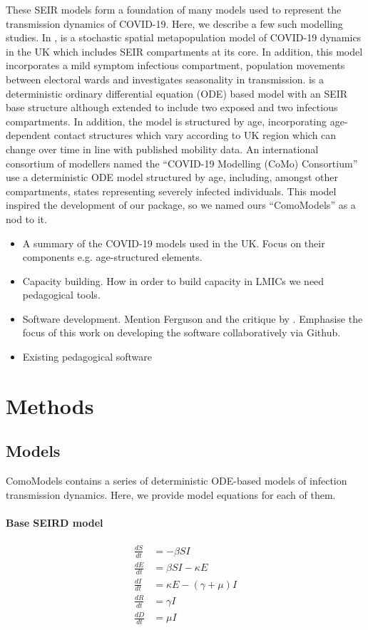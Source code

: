 \documentclass[]{article}
\begin{document}
These SEIR models form a foundation of many models used to represent the transmission dynamics of COVID-19. Here, we describe a few such modelling studies.  In \cite{danon2020spatial}, is a stochastic spatial metapopulation model of COVID-19 dynamics in the UK which includes SEIR compartments at its core. In addition, this model incorporates a mild symptom infectious compartment, population movements between electoral wards and investigates seasonality in transmission. \cite{birrell2021real} is a deterministic ordinary differential equation (ODE) based model with an SEIR base structure although extended to include two exposed and two infectious compartments. In addition, the model is structured by age, incorporating age-dependent contact structures which vary according to UK region which can change over time in line with published mobility data. An international consortium of modellers named the ``COVID-19 Modelling (CoMo) Consortium'' \citep{aguas2020modelling} use a deterministic ODE model structured by age, including, amongst other compartments, states representing severely infected individuals. This model inspired the development of our package, so we named ours ``ComoModels'' as a nod to it.



\begin{itemize}
	\item A summary of the COVID-19 models used in the UK. Focus on their components e.g. age-structured elements.
	\item Capacity building. How in order to build capacity in LMICs we need pedagogical tools.
	\item Software development. Mention Ferguson and the critique by \cite{horner2020software}. Emphasise the focus of this work on developing the software collaboratively via Github.
	\item Existing pedagogical software
\end{itemize}

\section{Methods}
\subsection{Models}
ComoModels contains a series of deterministic ODE-based models of infection transmission dynamics. Here, we provide model equations for each of them.

\paragraph{Base SEIRD model}
\begin{align}
\frac{dS}{dt} &= - \beta S I\\
\frac{dE}{dt} &= \beta S I - \kappa E\\
\frac{dI}{dt} &= \kappa E - (\gamma + \mu) I\\
\frac{dR}{dt} &= \gamma I\\
\frac{dD}{dt} &= \mu I
\end{align}
\end{document}
